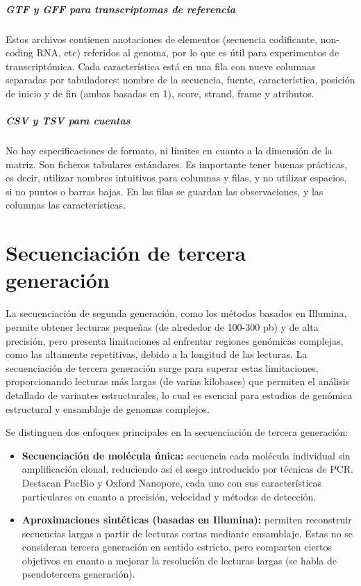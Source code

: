\begin{itemize}
\paragraph{GTF y GFF para transcriptomas de referencia} 
Estos archivos contienen anotaciones de elementos (secuencia codificante, non-coding RNA, etc) referidos al genoma, por lo que es útil para experimentos de transcriptómica. Cada característica está en una fila con nueve columnas separadas por tabuladores: nombre de la secuencia, fuente, característica, posición de inicio y de fin (ambas basadas en 1), score, strand, frame y atributos. 

\paragraph{CSV y TSV para cuentas}
No hay especificaciones de formato, ni límites en cuanto a la dimensión de la matriz. Son ficheros tabulares estándares. Es importante tener buenas prácticas, es decir, utilizar nombres intuitivos para columnas y filas, y no utilizar espacios, si no puntos o barras bajas. En las filas se guardan las observaciones, y las columnas las características. 

\chapter{Secuenciación de tercera generación}
La secuenciación de segunda generación, como los métodos basados en Illumina, permite obtener lecturas pequeñas (de alrededor de 100-300 pb) y de alta precisión, pero presenta limitaciones al enfrentar regiones genómicas complejas, como las altamente repetitivas, debido a la longitud de las lecturas. La secuenciación de tercera generación surge para superar estas limitaciones, proporcionando lecturas más largas (de varias kilobases) que permiten el análisis detallado de variantes estructurales, lo cual es esencial para estudios de genómica estructural y ensamblaje de genomas complejos.

Se distinguen dos enfoques principales en la secuenciación de tercera generación:
\begin{itemize}
\item \textbf{Secuenciación de molécula única:} secuencia cada molécula individual sin amplificación clonal, reduciendo así el sesgo introducido por técnicas de PCR. Destacan PacBio y Oxford Nanopore, cada uno con sus características particulares en cuanto a precisión, velocidad y métodos de detección.
\item \textbf{Aproximaciones sintéticas (basadas en Illumina):} permiten reconstruir secuencias largas a partir de lecturas cortas mediante ensamblaje. Estas no se consideran tercera generación en sentido estricto, pero comparten ciertos objetivos en cuanto a mejorar la resolución de lecturas largas (se habla de pseudotercera generación).
\end{itemize}


\end{itemize}

